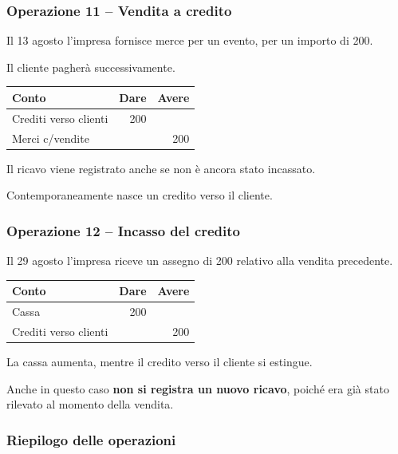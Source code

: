 \subsubsection*{Operazione 11 -- Vendita a credito}

\noindent Il 13 agosto l'impresa fornisce
merce per un evento, per un importo di 200.

\medskip

\noindent Il cliente pagherà successivamente.

\begin{center}
\begin{tabular}{|l|r|r|}
\hline
\textbf{Conto} & \textbf{Dare} & \textbf{Avere} \\
\hline
Crediti verso clienti & 200 & \\
\hline
Merci c/vendite & & 200 \\
\hline
\end{tabular}
\end{center}

\noindent Il ricavo viene registrato
anche se non è ancora stato incassato.

\medskip

\noindent Contemporaneamente nasce
un credito verso il cliente.


\subsubsection*{Operazione 12 -- Incasso del credito}

\noindent Il 29 agosto l'impresa riceve
un assegno di 200 relativo alla vendita precedente.

\begin{center}
\begin{tabular}{|l|r|r|}
\hline
\textbf{Conto} & \textbf{Dare} & \textbf{Avere} \\
\hline
Cassa & 200 & \\
\hline
Crediti verso clienti & & 200 \\
\hline
\end{tabular}
\end{center}

\noindent La cassa aumenta,
mentre il credito verso il cliente si estingue.

\medskip

\noindent Anche in questo caso
\textbf{non si registra un nuovo ricavo},
poiché era già stato rilevato
al momento della vendita.


\subsubsection*{Riepilogo delle operazioni}

